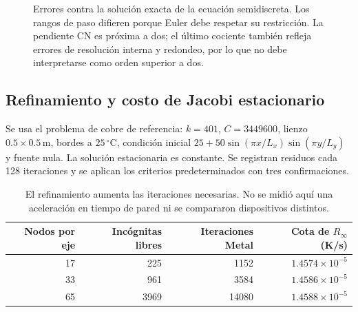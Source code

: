 \documentclass[11pt,a4paper]{article}
\newcommand{\dt}{\Delta t}
\begin{document}
\begin{figure}[htbp]\centering
{}
\caption{Errores contra la solución exacta de la ecuación semidiscreta. Los
rangos de paso difieren porque Euler debe respetar su restricción. La pendiente
CN es próxima a dos; el último cociente también refleja errores de resolución
interna y redondeo, por lo que no debe interpretarse como orden superior a dos.}
\label{fig:temporal}
\end{figure}

\subsection{Refinamiento y costo de Jacobi estacionario}
Se usa el problema de cobre de referencia: $k=401$, $C=3449600$,
lienzo $0.5\times0.5\,\mathrm m$, bordes a $25\,{}^\circ\mathrm C$,
condición inicial $25+50\sin(\pi x/L_x)\sin(\pi y/L_y)$ y fuente nula.
La solución estacionaria es constante. Se registran residuos cada 128
iteraciones y se aplican los criterios predeterminados con tres confirmaciones.

\begin{table}[htbp]\centering\small
\begin{tabular}{@{}rrrr@{}}\toprule
Nodos por eje & Incógnitas libres & Iteraciones Metal & Cota de $R_\infty$ (K/s)\\\midrule
17 & 225 & 1152 & $1.4574\times10^{-5}$ \\
33 & 961 & 3584 & $1.4586\times10^{-5}$ \\
65 & 3969 & 14080 & $1.4588\times10^{-5}$ \\
\bottomrule\end{tabular}
\caption{El refinamiento aumenta las iteraciones necesarias. No se midió aquí
una aceleración en tiempo de pared ni se compararon dispositivos distintos.}
\end{table}
\end{document}
